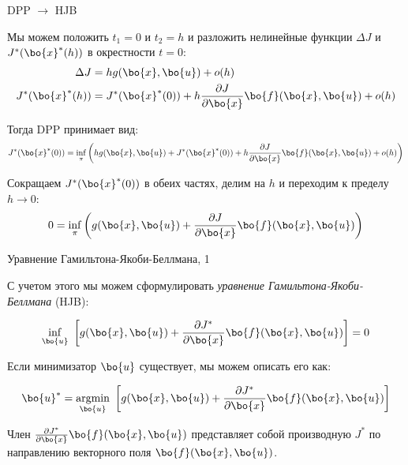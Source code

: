 \documentclass{beamer}
\begin{document}
\begin{frame}{DPP $\rightarrow$ HJB}
	\begin{flushleft}
		
		Мы можем положить $t_1 = 0$ и $t_2 = h$ и разложить нелинейные функции $\Delta J$ и $J^*(\bo{x}^*(h))$ в окрестности $t = 0$:
		\begin{align}
			\Delta J &= h g(\bo{x}, \bo{u}) + o(h)
			\\
			J^*(\bo{x}^*(h)) &= J^*(\bo{x}^*(0)) + h \frac{\partial J}{\partial \bo{x}} \bo{f} (\bo{x}, \bo{u}) + o(h)
		\end{align}
		
		Тогда DPP принимает вид:
		\begin{equation}
			J^*(\bo{x}^*(0)) = \inf_\pi \left(  h g(\bo{x}, \bo{u})  +  J^*(\bo{x}^*(0)) + h \frac{\partial J}{\partial \bo{x}} \bo{f} (\bo{x}, \bo{u}) + o(h)  \right)
		\end{equation}
		
		Сокращаем $J^*(\bo{x}^*(0))$ в обеих частях, делим на $h$ и переходим к пределу $h \rightarrow 0$:
		\begin{equation}
			0 = \inf_\pi \left( g(\bo{x}, \bo{u})  +  \frac{\partial J}{\partial \bo{x}} \bo{f} (\bo{x}, \bo{u})  \right)
		\end{equation}
		
		
	\end{flushleft}
\end{frame}



\begin{frame}{Уравнение Гамильтона-Якоби-Беллмана, 1}
	\begin{flushleft}
		
		С учетом этого мы можем сформулировать \emph{уравнение Гамильтона-Якоби-Беллмана} (HJB):
		
		\begin{equation}
			\label{eq:HJB_0}
			\underset{\bo{u}}{\inf} \ 
			\left[ 
			g(\bo{x}, \bo{u}) + 
			\frac{\partial J^*}{\partial \bo{x}} \bo{f} (\bo{x}, \bo{u}) 
			\right] = 0
		\end{equation}
		
		\bigskip
		
		
		Если минимизатор $\bo{u}$ существует, мы можем описать его как:
		
		\begin{equation}
			\bo{u}^* = \underset{\bo{u}}{\text{argmin}} \ 
			\left[ 
			g(\bo{x}, \bo{u}) + 
			\frac{\partial J^*}{\partial \bo{x}} \bo{f} (\bo{x}, \bo{u}) \right] 
		\end{equation}
		
		Член $\frac{\partial J^*}{\partial \bo{x}} \bo{f} (\bo{x}, \bo{u})$ представляет собой производную $J^*$ по направлению векторного поля $\bo{f} (\bo{x}, \bo{u})$. 
		
		
	\end{flushleft}
\end{frame}
\end{document}
